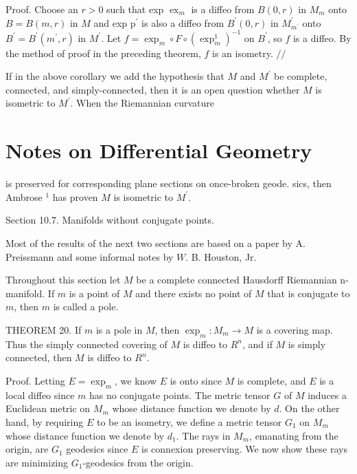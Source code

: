 \documentclass[10pt]{article}
\begin{document}
Proof. Choose an $r>0$ such that exp $\operatorname{ex}_{m}$ is a diffeo from $B(0, r)$ in $M_{m}$ onto $B=B(m, r)$ in $M$ and exp $\mathrm{p}^{\prime}$ is also a diffeo from $B^{\prime}(0, r)$ in $M_{m^{\prime}}^{\prime}$ onto $B^{\prime}=B^{\prime}\left(m^{\prime}, r\right)$ in $M^{\prime} .$ Let $f=\exp _{m} \circ F \circ\left(\exp _{m}^{1}\right)^{-1}$ on $B^{\prime}$, so $f$ is a diffeo. By the method of proof in the preceding theorem, $f$ is an isometry. $/ /$

If in the above corollary we add the hypothesis that $M$ and $M^{\prime}$ be complete, connected, and simply-connected, then it is an open question whether $M$ is isometric to $M^{\prime}$. When the Riemannian curvature

\section{Notes on Differential Geometry}
is preserved for corresponding plane sections on once-broken geode. sics, then Ambrose ${ }^{1}$ has proven $M$ is isometric to $M^{\prime}$.

Section 10.7. Manifolds without conjugate points.

Most of the results of the next two sections are based on a paper by A. Preissmann and some informal notes by $W$. B. Houston, Jr.

Throughout this section let $M$ be a complete connected Hausdorff Riemannian n-manifold. If $m$ is a point of $M$ and there exists no point of $M$ that is conjugate to $m$, then $m$ is called a pole.

THEOREM 20. If $m$ is a pole in $M$, then $\exp _{m}: M_{m} \rightarrow M$ is a covering map. Thus the simply connected covering of $M$ is diffeo to $R^{n}$, and if $M$ is simply connected, then $M$ is diffeo to $R^{n}$.

Proof. Letting $E=\exp _{m}$, we know $E$ is onto since $M$ is complete, and $E$ is a local diffeo since $m$ has no conjugate points. The metric tensor $G$ of $M$ induces a Euclidean metric on $M_{m}$ whose distance function we denote by $d$. On the other hand, by requiring $E$ to be an isometry, we define a metric tensor $G_{1}$ on $M_{m}$ whose distance function we denote by $d_{1}$. The rays in $M_{m}$, emanating from the origin, are $G_{1}$ geodesics since $E$ is connexion preserving. We now show these rays are minimizing $G_{1}$-geodesics from the origin.
\end{document}
